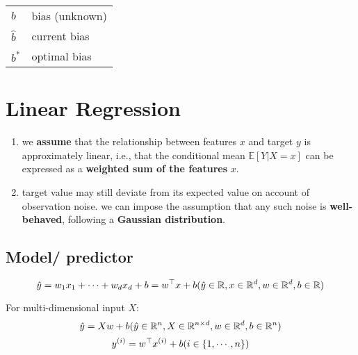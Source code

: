 \begin{table}[H]
\begin{minipage}[t]{0.49\linewidth}
\begin{customTableWrapper}{1.3}
\begin{table}[H]
\begin{tabular}{|l l|}
                \hline
        
                $b$ & bias (unknown) \\
                $\hat{b}$ & current bias \\
                $b^\ast$ & optimal bias \\
        
                \hline

            \end{tabular}
        \end{table}
        \end{customTableWrapper}
    \end{minipage}
\end{table}


\section{Linear Regression \cite{dnn-1}} \label{Linear Regression}

\begin{enumerate}[itemsep=0.15cm]
    \item we \textbf{assume} that the relationship between features $x$ and target $y$ is approximately linear, i.e., that the conditional mean $\mathbb{E}[Y | X = x]$ can be expressed as a \textbf{weighted sum of the features} $x$.

    \item target value may still deviate from its expected value on account of observation noise. we can impose the assumption that any such noise is \textbf{well-behaved}, following a \textbf{Gaussian distribution}.

\end{enumerate}

\subsection{Model/ predictor \cite{dnn-1}}
\[
    \hfill
    \hat{y} = w_1x_1 + \cdots + w_dx_d + b
    = w^\top x + b
    \hfill
    (
        \hat{y} \in \mathbb{R},
        x \in \mathbb{R}^d ,
        w \in \mathbb{R}^d,
        b \in \mathbb{R}
    )
\]
    

\noindent
For multi-dimensional input $X$:
\[
    \hfill
    \hat{y} = Xw + b
    \hfill
    (
        \hat{y} \in \mathbb{R}^n,
        X \in \mathbb{R}^{n\times d}, 
        w \in \mathbb{R}^d,
        b \in \mathbb{R}^n
    )
\]
\[
    \hfill
    y^{(i)} = w^\top x^{(i)} + b
    \hfill
    (i \in \dCurlyBrac{1,\cdots,n})
\]

